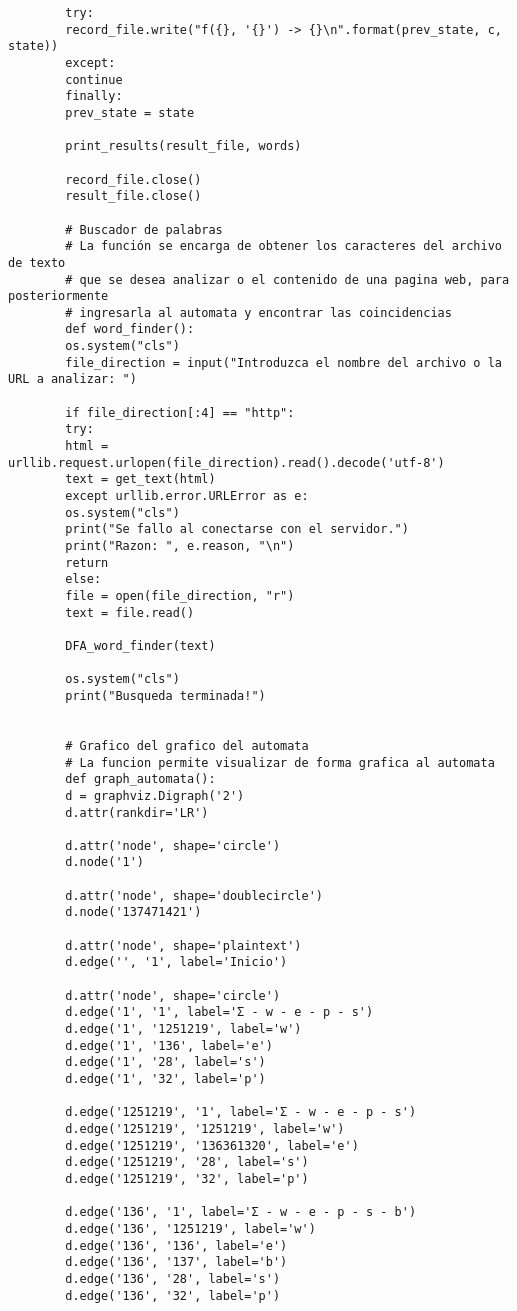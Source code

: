 \documentclass{article}
\begin{document}
\begin{lstlisting}
		try:            
		record_file.write("f({}, '{}') -> {}\n".format(prev_state, c, state))
		except:
		continue
		finally:
		prev_state = state
		
		print_results(result_file, words)
		
		record_file.close()
		result_file.close()
		
		# Buscador de palabras
		# La función se encarga de obtener los caracteres del archivo de texto
		# que se desea analizar o el contenido de una pagina web, para posteriormente
		# ingresarla al automata y encontrar las coincidencias
		def word_finder():
		os.system("cls")
		file_direction = input("Introduzca el nombre del archivo o la URL a analizar: ")
		
		if file_direction[:4] == "http":
		try:
		html = urllib.request.urlopen(file_direction).read().decode('utf-8')
		text = get_text(html)
		except urllib.error.URLError as e:
		os.system("cls")
		print("Se fallo al conectarse con el servidor.")
		print("Razon: ", e.reason, "\n")
		return
		else:
		file = open(file_direction, "r")
		text = file.read()
		
		DFA_word_finder(text)
		
		os.system("cls")
		print("Busqueda terminada!")
		
		
		# Grafico del grafico del automata
		# La funcion permite visualizar de forma grafica al automata
		def graph_automata():
		d = graphviz.Digraph('2')
		d.attr(rankdir='LR')
		
		d.attr('node', shape='circle')
		d.node('1')
		
		d.attr('node', shape='doublecircle')
		d.node('137471421')
		
		d.attr('node', shape='plaintext')
		d.edge('', '1', label='Inicio')
		
		d.attr('node', shape='circle')
		d.edge('1', '1', label='Σ - w - e - p - s')
		d.edge('1', '1251219', label='w')
		d.edge('1', '136', label='e')
		d.edge('1', '28', label='s')
		d.edge('1', '32', label='p')
		
		d.edge('1251219', '1', label='Σ - w - e - p - s')
		d.edge('1251219', '1251219', label='w')
		d.edge('1251219', '136361320', label='e')
		d.edge('1251219', '28', label='s')
		d.edge('1251219', '32', label='p')
		
		d.edge('136', '1', label='Σ - w - e - p - s - b')
		d.edge('136', '1251219', label='w')
		d.edge('136', '136', label='e')
		d.edge('136', '137', label='b')
		d.edge('136', '28', label='s')
		d.edge('136', '32', label='p')
		

\end{lstlisting}
\end{document}
